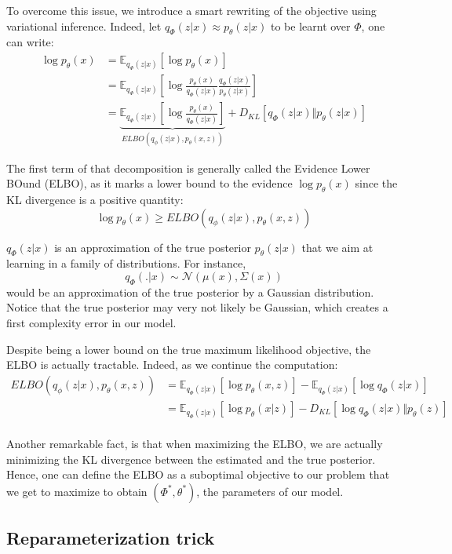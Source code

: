 To overcome this issue, we introduce a smart rewriting of the objective using variational inference. Indeed, let $q_{\Phi}(z|x) \approx p_{\theta}(z|x)$ to be learnt over $\Phi$, one can write:
$$
\begin{align}
    \log p_{\theta}(x) &= \mathbb{E}_{q_{\Phi}(z|x)}[\log p_{\theta}(x)] \\
    &= \mathbb{E}_{q_{\Phi}(z|x)}\left[\log \frac{p_{\theta}(x)}{q_{\Phi}(z|x)} \frac{q_{\Phi}(z|x)}{p_{\theta}(z|x)}\right]
    \\
    &= \underbrace{\mathbb{E}_{q_{\Phi}(z|x)} \left[\log \frac{p_{\theta}(x)}{q_{\Phi}(z|x)}\right]}_{ELBO(q_\phi(z|x), p_{\theta}(x,z))} + D_{KL}\left[q_{\Phi}(z|x) \Vert p_{\theta}(z|x)\right]
\end{align}
$$

The first term of that decomposition is generally called the Evidence Lower BOund (ELBO), as it marks a lower bound to the evidence $\log p_{\theta}(x)$ since the KL divergence is a positive quantity:
$$
\log p_{\theta}(x) \ge ELBO(q_\phi(z|x), p_{\theta}(x,z))
$$

$q_{\Phi}(z|x)$ is an approximation of the true posterior $p_{\theta}(z|x)$ that we aim at learning in a family of distributions. For instance, 
$$
q_{\Phi}(.|x) \sim \mathcal{N}(\mu(x), \Sigma(x))
$$ 
would be an approximation of the true posterior by a Gaussian distribution. Notice that the true posterior may very not likely be Gaussian, which creates a first complexity error in our model.

Despite being a lower bound on the true maximum likelihood objective, the ELBO is actually tractable. Indeed, as we continue the computation:
$$
\begin{align}
    ELBO(q_\phi(z|x), p_{\theta}(x,z)) &= \mathbb{E}_{q_{\Phi}(z|x)}[\log p_{\theta}(x,z)] - \mathbb{E}_{q_{\Phi}(z|x)}[\log q_{\Phi}(z|x)] \\
    &= 
\mathbb{E}_{q_{\Phi}(z|x)}[\log p_{\theta}(x|z)] - D_{KL}[\log q_{\Phi}(z|x) \Vert p_{\theta}(z)] \\\end{align}
$$

Another remarkable fact, is that when maximizing the ELBO, we are actually minimizing the KL divergence between the estimated and the true posterior. Hence, one can define the ELBO as a suboptimal objective to our problem that we get to maximize to obtain $(\Phi^*, \theta^*)$, the parameters of our model.

\subsection{Reparameterization trick}

